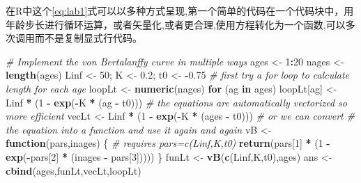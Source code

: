 \documentclass[
  lang=cn,
  11pt,
  scheme=chinese,
  chinesefont=nofont,
  citestyle=gb7714-2015,
  bibstyle=gb7714-2015]{elegantbook}
\newenvironment{Shaded}{\begin{snugshade}}{\end{snugshade}}
\newcommand{\CommentTok}[1]{\textcolor[rgb]{0.56,0.35,0.01}{\textit{#1}}}
\newcommand{\ControlFlowTok}[1]{\textcolor[rgb]{0.13,0.29,0.53}{\textbf{#1}}}
\newcommand{\DecValTok}[1]{\textcolor[rgb]{0.00,0.00,0.81}{#1}}
\newcommand{\FloatTok}[1]{\textcolor[rgb]{0.00,0.00,0.81}{#1}}
\newcommand{\FunctionTok}[1]{\textcolor[rgb]{0.13,0.29,0.53}{\textbf{#1}}}
\newcommand{\NormalTok}[1]{#1}
\newcommand{\OtherTok}[1]{\textcolor[rgb]{0.56,0.35,0.01}{#1}}
\newcommand{\SpecialCharTok}[1]{\textcolor[rgb]{0.81,0.36,0.00}{\textbf{#1}}}
\begin{document}
在R中这个\eqref{eq:lab1}式可以以多种方式呈现,第一个简单的代码在一个代码块中，用年龄步长进行循环运算，或者矢量化,或者更合理,使用方程转化为一个函数,可以多次调用而不是复制显式行代码。

\begin{Shaded}
\begin{Highlighting}[]
 \CommentTok{\# Implement the von Bertalanffy curve in multiple ways  }
\NormalTok{ages }\OtherTok{\textless{}{-}} \DecValTok{1}\SpecialCharTok{:}\DecValTok{20}  
\NormalTok{nages }\OtherTok{\textless{}{-}} \FunctionTok{length}\NormalTok{(ages)  }
\NormalTok{Linf }\OtherTok{\textless{}{-}} \DecValTok{50}\NormalTok{;  K }\OtherTok{\textless{}{-}} \FloatTok{0.2}\NormalTok{;  t0 }\OtherTok{\textless{}{-}} \SpecialCharTok{{-}}\FloatTok{0.75}  
 \CommentTok{\# first try a for loop to calculate length for each age  }
\NormalTok{loopLt }\OtherTok{\textless{}{-}} \FunctionTok{numeric}\NormalTok{(nages)  }
\ControlFlowTok{for}\NormalTok{ (ag }\ControlFlowTok{in}\NormalTok{ ages) loopLt[ag] }\OtherTok{\textless{}{-}}\NormalTok{ Linf }\SpecialCharTok{*}\NormalTok{ (}\DecValTok{1} \SpecialCharTok{{-}} \FunctionTok{exp}\NormalTok{(}\SpecialCharTok{{-}}\NormalTok{K }\SpecialCharTok{*}\NormalTok{ (ag }\SpecialCharTok{{-}}\NormalTok{ t0)))  }
 \CommentTok{\# the equations are automatically vectorized so more efficient  }
\NormalTok{vecLt }\OtherTok{\textless{}{-}}\NormalTok{ Linf }\SpecialCharTok{*}\NormalTok{ (}\DecValTok{1} \SpecialCharTok{{-}} \FunctionTok{exp}\NormalTok{(}\SpecialCharTok{{-}}\NormalTok{K }\SpecialCharTok{*}\NormalTok{ (ages }\SpecialCharTok{{-}}\NormalTok{ t0))) }\CommentTok{\# or we can convert   }
 \CommentTok{\# the equation into a function and use it again and again  }
\NormalTok{vB }\OtherTok{\textless{}{-}} \ControlFlowTok{function}\NormalTok{(pars,inages) \{ }\CommentTok{\# requires pars=c(Linf,K,t0)  }
  \FunctionTok{return}\NormalTok{(pars[}\DecValTok{1}\NormalTok{] }\SpecialCharTok{*}\NormalTok{ (}\DecValTok{1} \SpecialCharTok{{-}} \FunctionTok{exp}\NormalTok{(}\SpecialCharTok{{-}}\NormalTok{pars[}\DecValTok{2}\NormalTok{] }\SpecialCharTok{*}\NormalTok{ (inages }\SpecialCharTok{{-}}\NormalTok{ pars[}\DecValTok{3}\NormalTok{]))))  }
\NormalTok{\}  }
\NormalTok{funLt }\OtherTok{\textless{}{-}} \FunctionTok{vB}\NormalTok{(}\FunctionTok{c}\NormalTok{(Linf,K,t0),ages)  }
\NormalTok{ans }\OtherTok{\textless{}{-}} \FunctionTok{cbind}\NormalTok{(ages,funLt,vecLt,loopLt)  }
\end{Highlighting}
\end{Shaded}
\end{document}
